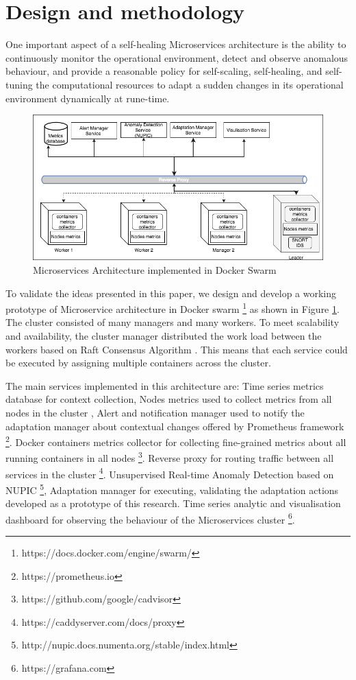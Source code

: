 \documentclass[sigconf]{acmart}
\begin{document}
\section{Design and methodology}
\label{sec:modelling}
One important aspect of a self-healing Microservices architecture is the ability to continuously monitor the operational environment, detect and observe anomalous behaviour, and provide a reasonable policy for self-scaling, self-healing, and self-tuning the computational resources to adapt a sudden changes in its operational environment dynamically at rune-time.  
\begin{figure}[!ht] 
\includegraphics[scale=0.4]{design}
\caption{Microservices Architecture implemented in Docker Swarm}
\label{fig_model}
\end{figure}

To validate the ideas presented in this paper, we design and develop a working prototype of Microservice architecture in Docker swarm \footnote{https://docs.docker.com/engine/swarm/} as shown in Figure \ref{fig_model}. The cluster consisted of many managers and many workers. To meet scalability and availability, the cluster manager distributed the work load between the workers based on Raft Consensus Algorithm \cite{ongaro2015raft}. This means that each service could be executed by assigning multiple containers across the cluster. 

The main services implemented in this architecture are: Time series metrics database for context collection, Nodes metrics used to collect metrics from all nodes in the cluster , Alert and notification manager used to notify the adaptation manager about contextual changes offered by  Prometheus framework \footnote{https://prometheus.io}. Docker containers metrics collector for collecting fine-grained metrics about all running containers in all nodes \footnote{https://github.com/google/cadvisor}. Reverse proxy for routing traffic between all services in the cluster \footnote{https://caddyserver.com/docs/proxy}. Unsupervised Real-time Anomaly Detection based on NUPIC \footnote{http://nupic.docs.numenta.org/stable/index.html}, Adaptation manager for executing, validating the adaptation actions developed as a prototype of this research. Time series analytic and visualisation dashboard for observing the behaviour of the Microservices cluster \footnote{https://grafana.com}. 
 
\end{document}
